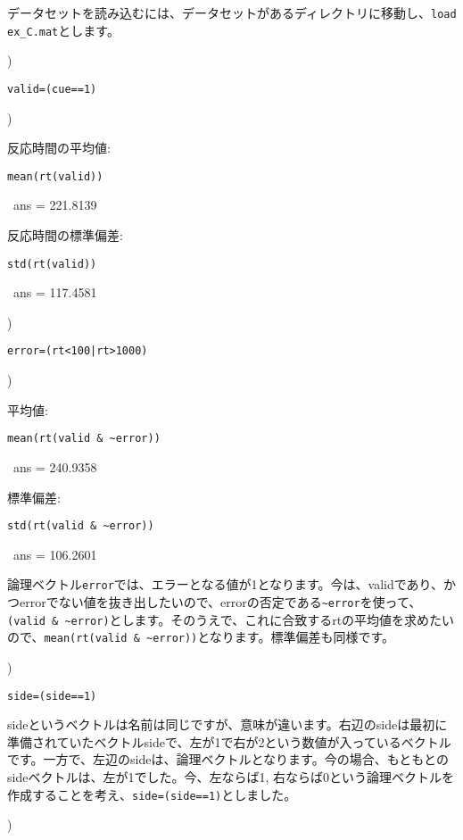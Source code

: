 \documentclass{jsarticle}
\begin{document}
\begin{screen}
データセットを読み込むには、データセットがあるディレクトリに移動し、{\tt load ex\_C.mat}とします。
\end{screen}

)

{\tt valid=(cue==1)}

\bigskip

)

反応時間の平均値: {\tt mean(rt(valid)) 

\ ans = 221.8139}

反応時間の標準偏差: {\tt std(rt(valid)) 

\ ans = 117.4581}

\bigskip

)

{\tt error=(rt<100|rt>1000)}

\bigskip

)

平均値: {\tt mean(rt(valid \& \verb|~error|)) 

\ ans = 240.9358}

標準偏差: {\tt std(rt(valid \& \verb|~error|)) 

\ ans = 106.2601}

\begin{screen}
論理ベクトル{\tt error}では、エラーとなる値が1となります。今は、validであり、かつerrorでない値を抜き出したいので、errorの否定である{\tt \verb|~error|}を使って、{\tt (valid \& \verb|~error|)}とします。そのうえで、これに合致するrtの平均値を求めたいので、{\tt mean(rt(valid \& \verb|~error|))}となります。標準偏差も同様です。
\end{screen}

\bigskip

)

{\tt side=(side==1)}

\begin{screen}
sideというベクトルは名前は同じですが、意味が違います。右辺のsideは最初に準備されていたベクトルsideで、左が1で右が2という数値が入っているベクトルです。一方で、左辺のsideは、論理ベクトルとなります。今の場合、もともとのsideベクトルは、左が1でした。今、左ならば1, 右ならば0という論理ベクトルを作成することを考え、{\tt side=(side==1)}としました。
\end{screen}

\bigskip

)
\end{document}
